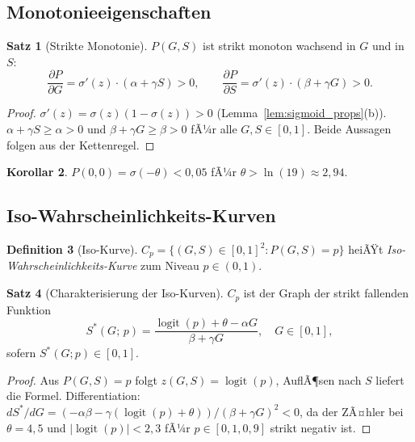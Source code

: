 ﻿\documentclass[12pt, a4paper]{article}
\theoremstyle{definition}
\newtheorem{definition}{Definition}[section]
\newtheorem{satz}[definition]{Satz}
\newtheorem{korollar}[definition]{Korollar}
\theoremstyle{remark}
\DeclareMathOperator{\logit}{logit}
\begin{document}
\subsection{Monotonieeigenschaften}

\begin{satz}[Strikte Monotonie]
\label{satz:monotonie}
$P(G,S)$ ist strikt monoton wachsend in $G$ und in $S$:
\[
  \frac{\partial P}{\partial G} = \sigma'(z)\cdot(\alpha + \gamma S) > 0,
  \qquad
  \frac{\partial P}{\partial S} = \sigma'(z)\cdot(\beta + \gamma G) > 0.
\]
\end{satz}

\begin{proof}
$\sigma'(z) = \sigma(z)(1-\sigma(z)) > 0$ (Lemma~\ref{lem:sigmoid_props}(b)).
$\alpha + \gamma S \geq \alpha > 0$ und $\beta + \gamma G \geq \beta > 0$
fÃ¼r alle $G,S \in [0,1]$. Beide Aussagen folgen aus der Kettenregel.
\end{proof}

\begin{korollar}
\label{kor:grenzwerte}
$P(0,0) = \sigma(-\theta) < 0{,}05$ fÃ¼r $\theta > \ln(19) \approx 2{,}94$.
\end{korollar}

\subsection{Iso-Wahrscheinlichkeits-Kurven}

\begin{definition}[Iso-Kurve]
\label{def:isokurve}
$C_p = \{(G,S) \in [0,1]^2 : P(G,S) = p\}$ heiÃŸt
\emph{Iso-Wahrschein\-lichkeits-Kurve} zum Niveau $p \in (0,1)$.
\end{definition}

\begin{satz}[Charakterisierung der Iso-Kurven]
\label{satz:isokurven}
$C_p$ ist der Graph der strikt fallenden Funktion
\[
  S^*(G;\,p) = \frac{\logit(p) + \theta - \alpha G}{\beta + \gamma G},
  \quad G \in [0,1],
\]
sofern $S^*(G;p) \in [0,1]$.
\end{satz}

\begin{proof}
Aus $P(G,S) = p$ folgt $z(G,S) = \logit(p)$, AuflÃ¶sen nach $S$ liefert die Formel.
Differentiation: $dS^*/dG = (-\alpha\beta - \gamma(\logit(p)+\theta))/(\beta+\gamma G)^2 < 0$,
da der ZÃ¤hler bei $\theta = 4{,}5$ und $|\logit(p)| < 2{,}3$ fÃ¼r $p \in [0{,}1, 0{,}9]$
strikt negativ ist.
\end{proof}
\end{document}
